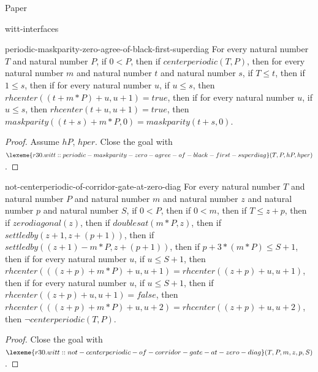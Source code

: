 \begin{lexlean}{Paper}
\begin{section}{witt-interfaces}
  \begin{theorem}{periodic-maskparity-zero-agree-of-black-first-superdiag}
  For every natural number \(T\) and natural number \(P\), if \(0 < P\), then if \(centerperiodic(T, P)\), then for every natural number \(m\) and natural number \(t\) and natural number \(s\), if \(T ≤ t\), then if \(1 ≤ s\), then if for every natural number \(u\), if \(u ≤ s\), then \(rhcenter((t + m * P) + u, u + 1) = true\), then if for every natural number \(u\), if \(u ≤ s\), then \(rhcenter(t + u, u + 1) = true\), then \(maskparity((t + s) + m * P, 0) = maskparity(t + s, 0)\).
  \begin{proof}
  Assume \(hP\), \(hper\).
  Close the goal with \(\lexeme{r30.witt::periodic-maskparity-zero-agree-of-black-first-superdiag}(T, P, hP, hper)\).
  \end{proof}
  \end{theorem}

  \begin{theorem}{not-centerperiodic-of-corridor-gate-at-zero-diag}
  For every natural number \(T\) and natural number \(P\) and natural number \(m\) and natural number \(z\) and natural number \(p\) and natural number \(S\), if \(0 < P\), then if \(0 < m\), then if \(T ≤ z + p\), then if \(zerodiagonal(z)\), then if \(doublesat(m * P, z)\), then if \(settledby(z + 1, z + (p + 1))\), then if \(settledby((z + 1) - m * P, z + (p + 1))\), then if \(p + 3 * (m * P) ≤ S + 1\), then if for every natural number \(u\), if \(u ≤ S + 1\), then \(rhcenter(((z + p) + m * P) + u, u + 1) = rhcenter((z + p) + u, u + 1)\), then if for every natural number \(u\), if \(u ≤ S + 1\), then if \(rhcenter((z + p) + u, u + 1) = false\), then \(rhcenter(((z + p) + m * P) + u, u + 2) = rhcenter((z + p) + u, u + 2)\), then \(¬ centerperiodic(T, P)\).
  \begin{proof}
  Close the goal with \(\lexeme{r30.witt::not-centerperiodic-of-corridor-gate-at-zero-diag}(T, P, m, z, p, S)\).
  \end{proof}
  \end{theorem}


\end{section}
\end{lexlean}
